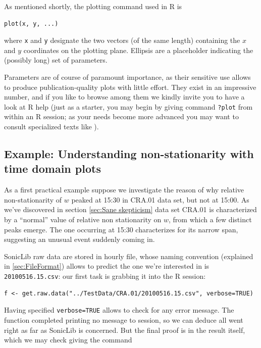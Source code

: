 \documentclass[a4paper,10pt]{book}
\begin{document}
As mentioned shortly, the plotting command used in R is

\begin{verbatim}
plot(x, y, ...)
\end{verbatim}

\noindent where \verb|x| and \verb|y| designate the two vectors (of the same length) containing the $x$ and $y$ coordinates on the plotting plane. Ellipsis are a placeholder indicating the (possibly long) set of parameters.

Parameters are of course of paramount importance, as their sensitive use allows to produce publication-quality plots with little effort. They exist in an impressive number, and if you like to browse among them we kindly invite you to have a look at R help (just as a starter, you may begin by giving command \verb|?plot| from within an R session; as your needs become more advanced you may want to consult specialized texts like \cite{Murrell2006}).

\subsection{Example: Understanding non-stationarity with time domain plots}

As a first practical example suppose we investigate the reason of why relative non-stationarity of $w$ peaked at 15:30 in CRA.01 data set, but not at 15:00. As we've discovered in section \ref{sec:Sane skepticism} data set CRA.01 is characterized by a ``normal'' value of relative non stationarity on $w$, from which a few distinct peaks emerge. The one occurring at 15:30 characterizes for its narrow span, suggesting an unusual event suddenly coming in.

SonicLib raw data are stored in hourly file, whose naming convention (explained in \ref{sec:FileFormat}) allows to predict the one we're interested in is \verb|20100516.15.csv|: our first task is grabbing it into the R session:

\begin{verbatim}
f <- get.raw.data("../TestData/CRA.01/20100516.15.csv", verbose=TRUE)
\end{verbatim}

Having specified \verb|verbose=TRUE| allows to check for any error message. The function completed printing no message to session, so we can deduce all went right as far as SonicLib is concerned. But the final proof is in the result itself, which we may check giving the command
\end{document}
